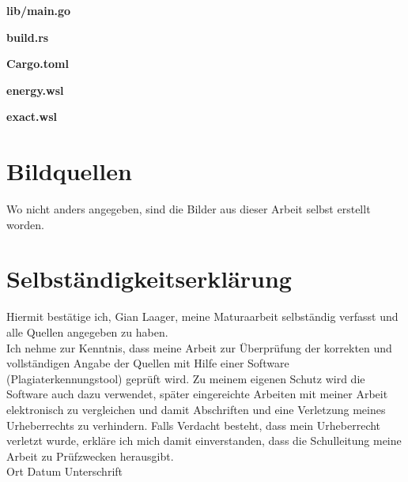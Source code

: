 \documentclass[11pt,DIV=10,final]{scrreprt} %
\begin{document}
\begin{appendix}
\vspace*{3ex}
{\noindent \large \bfseries lib/main.go}


\vspace*{3ex}
{\noindent \large \bfseries build.rs}


\vspace*{3ex}
{\noindent \large \bfseries Cargo.toml}


\vspace*{3ex}
{\noindent \large \bfseries energy.wsl}


\vspace*{3ex}
{\noindent \large \bfseries exact.wsl}


\end{appendix}
\chapter*{Bildquellen}
%
Wo nicht anders angegeben, sind die Bilder aus dieser Arbeit selbst erstellt worden.
%



%
\chapter*{Selbständigkeitserklärung}
%
Hiermit bestätige ich, Gian Laager, meine Maturaarbeit selbständig verfasst und alle Quellen angegeben zu haben.\\\newline
Ich nehme zur Kenntnis, dass meine Arbeit zur Überprüfung der korrekten und vollständigen Angabe der Quellen mit Hilfe einer Software (Plagiaterkennungstool) geprüft wird. Zu meinem eigenen Schutz wird die Software auch dazu verwendet, später eingereichte Arbeiten mit meiner Arbeit elektronisch zu vergleichen und damit Abschriften und eine Verletzung meines Urheberrechts zu verhindern. Falls Verdacht besteht, dass mein Urheberrecht verletzt wurde, erkläre ich mich damit einverstanden, dass die Schulleitung meine Arbeit zu Prüfzwecken herausgibt.\\\newline
Ort\hspace{4cm} Datum\hspace{4cm}  Unterschrift
%
\end{document}
